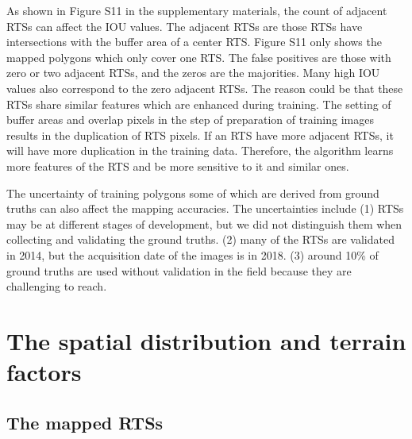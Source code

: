 \documentclass[preprint,12pt,authoryear]{elsarticle}
\begin{document}
As shown in Figure S11 in the supplementary materials, the count of adjacent RTSs can affect the IOU values. The adjacent RTSs are those RTSs have intersections with the buffer area of a center RTS. Figure S11 only shows the mapped polygons which only cover one RTS. The false positives are those with zero or two adjacent RTSs, and the zeros are the majorities. Many high IOU values also correspond to the zero adjacent RTSs. The reason could be that these RTSs share similar features which are enhanced during training. The setting of buffer areas and overlap pixels in the step of preparation of training images results in the duplication of RTS pixels. If an RTS have more adjacent RTSs, it will have more duplication in the training data. Therefore, the algorithm learns more features of the RTS and be more sensitive to it and similar ones. 

The uncertainty of training polygons some of which are derived from ground truths can also affect the mapping accuracies. The uncertainties include (1) RTSs may be at different stages of development, but we did not distinguish them when collecting and validating the ground truths. (2) many of the RTSs are validated in 2014, but the acquisition date of the images is in 2018. (3) around 10\% of ground truths are used without validation in the field because they are challenging to reach. 

\section{The spatial distribution and terrain factors}
\label{sec_spatial_terrain}

\subsection{The mapped RTSs }
\label{subsub_mapped_rts}
\end{document}
